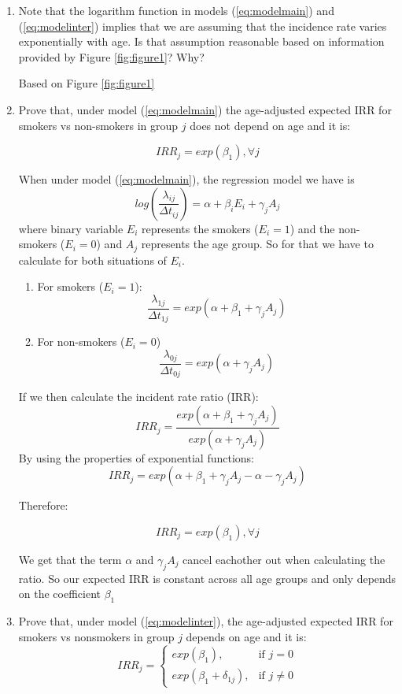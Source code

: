 \documentclass[10pt,a4paper,twoside]{article}\usepackage[]{graphicx}\usepackage[]{xcolor}
\begin{document}
\begin{enumerate}
    \item  Note that the logarithm function in models (\ref{eq:modelmain}) and (\ref{eq:modelinter}) implies that we are assuming that the incidence rate varies exponentially with age. Is that assumption reasonable based on information provided by Figure \ref{fig:figure1}? Why?

    Based on Figure \ref{fig:figure1} 

    \item Prove that, under model (\ref{eq:modelmain}) the age-adjusted expected IRR for smokers vs non-smokers in group $j$ does not depend on age and it is:

    \[
    IRR_{j} = exp(\beta_{1}),  \forall j
    \]
    
    When under model (\ref{eq:modelmain}), the regression model we have is
    \[
    log \left(\frac{\lambda_{ij}}{\Delta t_{ij}} \right) = \alpha + \beta_{i} E_{i} + \gamma_{j} A_{j}
    \]
    where binary variable $E_{i}$ represents the smokers ($E_{i} = 1$) and the non-smokers ($E_{i}=0$) and $A_{j}$ represents the age group. So for that we have to calculate for both situations of $E_{i}$.
    \begin{enumerate}
        \item For smokers ($E_{i} = 1$):
    \[
        \frac{\lambda_{1j}}{\Delta t_{1j}} = exp \left( \alpha + \beta_{1} + \gamma_{j} A_{j} \right)
    \]
        \item For non-smokers ($E_{i} = 0$)
        \[
        \frac{\lambda_{0j}}{\Delta t_{0j}} = exp \left( \alpha + \gamma_{j} A_{j} \right)
    \]
    \end{enumerate}
If we then calculate the incident rate ratio (IRR):
\[
        IRR_{j} = \frac{exp \left( \alpha + \beta_{1} + \gamma_{j} A_{j} \right) }{exp \left(\alpha + \gamma_{j} A_{j} \right)}
    \]
By using the properties of exponential functions:
\[
    IRR_{j} = exp \left(\alpha + \beta_{1} + \gamma_{j} A_{j} - \alpha - \gamma_{j} A_{j}\right)
\]

Therefore:

\[
    IRR_{j} = exp \left(\beta_{1}\right), \forall j
\]

We get that the term $\alpha$ and $\gamma_{j} A_{j}$ cancel eachother out when calculating the ratio. So our expected IRR is constant across all age groups and only depends on the coefficient $\beta_{1}$

\item Prove that, under model (\ref{eq:modelinter}), the age-adjusted expected IRR for smokers vs nonsmokers in group $j$ depends on age and it is:
\[
IRR_{j} =
\begin{cases}
exp\left(\beta_{1}\right), & \text{if $j = 0$} \\
exp\left(\beta_{1} + \delta_{1j}\right), & \text{if $j \neq 0$}
\end{cases}
\]


\end{enumerate}
\end{document}
